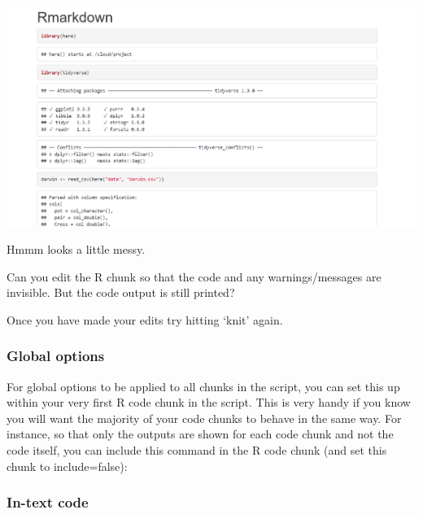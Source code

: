 \documentclass[
]{book}
\makeatletter
\newenvironment{Shaded}{\begin{snugshade}}{\end{snugshade}}
\newcommand{\AttributeTok}[1]{\textcolor[rgb]{0.77,0.63,0.00}{#1}}
\newcommand{\ConstantTok}[1]{\textcolor[rgb]{0.00,0.00,0.00}{#1}}
\newcommand{\FunctionTok}[1]{\textcolor[rgb]{0.00,0.00,0.00}{#1}}
\newcommand{\NormalTok}[1]{#1}
\newcommand{\SpecialCharTok}[1]{\textcolor[rgb]{0.00,0.00,0.00}{#1}}
\newenvironment{kframe}{%
\medskip{}
\setlength{\fboxsep}{.8em}
 \def\at@end@of@kframe{}%
 \ifinner\ifhmode%
  \def\at@end@of@kframe{\end{minipage}}%
  \begin{minipage}{\columnwidth}%
 \fi\fi%
 \def\FrameCommand##1{\hskip\@totalleftmargin \hskip-\fboxsep
 \colorbox{shadecolor}{##1}\hskip-\fboxsep
     \hskip-\linewidth \hskip-\@totalleftmargin \hskip\columnwidth}%
 \MakeFramed {\advance\hsize-\width
   \@totalleftmargin\z@ \linewidth\hsize
   \@setminipage}}%
 {\par\unskip\endMakeFramed%
 \at@end@of@kframe}
\newenvironment{block}[1]
  {
  \begin{itemize}
  \renewcommand{\labelitemi}{
    \raisebox{-.7\height}[0pt][0pt]{
      {\setkeys{Gin}{width=3em,keepaspectratio}\texttt{[image: images/\#1]}}
    }
  }
  \setlength{\fboxsep}{1em}
  \begin{kframe}
  \item
  }
  {
  \end{kframe}
  \end{itemize}
  }
\newenvironment{rmdquestion}
  {\begin{block}{question}}
  {\end{block}}
\makeatother
\begin{document}
\includegraphics[width=1.2\linewidth]{images/markdown_output}

\begin{rmdquestion}
Hmmm looks a little messy.

Can you edit the R chunk so that the code and any warnings/messages are
invisible. But the code output is still printed?

Once you have made your edits try hitting `knit' again.
\end{rmdquestion}

\hypertarget{global-options}{%
\subsubsection{Global options}\label{global-options}}

For global options to be applied to all chunks in the script, you can set this up within your very first R code chunk in the script.
This is very handy if you know you will want the majority of your code chunks to behave in the same way.
For instance, so that only the outputs are shown for each code chunk and not the code itself, you can include this command in the R code chunk (and set this chunk to include=false):

\begin{Shaded}
\end{Shaded}

\hypertarget{in-text-code}{%
\subsubsection{In-text code}\label{in-text-code}}
\end{document}
